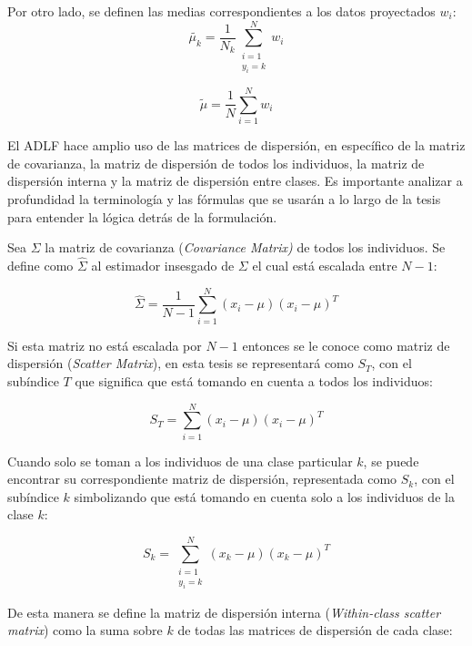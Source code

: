 Por otro lado, se definen las medias correspondientes a los datos proyectados $w_i$:
\begin{equation} \label{eq:20}
  \widetilde{\mu_k} = \frac{1}{N_{k}} 
  \sum_{\substack{i = 1\\
                    y_i = k}}^{N}
                  w_i
\end{equation} 

\begin{equation} \label{eq:21}
 \widetilde{\mu} = \frac{1}{N} \sum_{i = 1}^{N} w_i
\end{equation}

El ADLF hace amplio uso de las matrices de dispersión, en específico de la matriz de covarianza, la matriz de dispersión de todos los individuos, la matriz de dispersión interna y la matriz de dispersión entre clases. Es importante analizar a profundidad la terminología y las fórmulas que se usarán a lo largo de la tesis para entender la lógica detrás de la formulación.

Sea $\Sigma$ la matriz de covarianza (\textit{Covariance Matrix)} de todos los individuos. Se define como $\widehat{\Sigma}$ al estimador insesgado de $\Sigma$ el cual está escalada entre $N-1$:

\begin{equation} \label{eq:2.1}
\widehat{\Sigma} = \frac{1}{N-1} \sum_{i=1}^{N}(x_i - \mu)(x_i - \mu)^T	
\end{equation}

Si esta matriz no está escalada por $N-1$ entonces se le conoce como matriz de dispersión (\textit{Scatter Matrix}), en esta tesis se representará como $S_T$, con el subíndice $T$ que significa que está tomando en cuenta a todos los individuos:

\begin{equation} \label{eq:2.2}
S_T = \sum_{i=1}^{N}(x_i - \mu)(x_i - \mu)^T	
\end{equation}

Cuando solo se toman a los individuos de una clase particular $k$, se puede encontrar su correspondiente matriz de dispersión, representada como $S_k$, con el subíndice $k$ simbolizando que está tomando en cuenta solo a los individuos de la clase $k$:

\begin{equation*}
S_k = \sum_{\substack{i=1 \\ y_i = k}}^{N} (x_k - \mu)(x_k - \mu)^T	
\end{equation*}

De esta manera se define la matriz de dispersión interna (\textit{Within-class scatter matrix}) como la suma sobre $k$ de todas las matrices de dispersión de cada clase:

